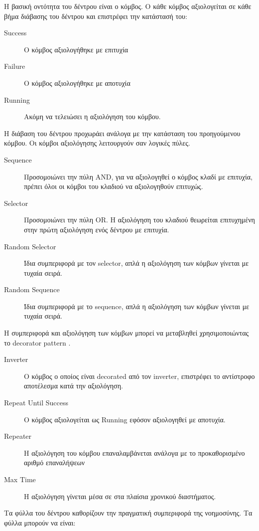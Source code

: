 Η βασική οντότητα του δέντρου είναι ο κόμβος. Ο κάθε κόμβος αξιολογείται σε κάθε βήμα διάβασης του δέντρου και επιστρέφει την κατάστασή του:
\begin{description}
	\item [Success] Ο κόμβος αξιολογήθηκε με επιτυχία
	\item [Failure] Ο κόμβος αξιολογήθηκε με αποτυχία
	\item [Running] Ακόμη να τελειώσει η αξιολόγηση του κόμβου.
\end{description}

Η διάβαση του δέντρου προχωράει ανάλογα με την κατάσταση του προηγούμενου κόμβου. Οι κόμβοι αξιολόγησης λειτουργούν σαν λογικές πύλες.

\begin{description}
	\item [Sequence] Προσομοιώνει την πύλη AND, για να αξιολογηθεί ο κόμβος κλαδί με επιτυχία, πρέπει όλοι οι κόμβοι του κλαδιού να αξιολογηθούν επιτυχώς.
	\item [Selector] Προσομοιώνει την πύλη ΟR. Η αξιολόγηση του κλαδιού θεωρείται επιτυχημένη στην πρώτη αξιολόγηση ενός δέντρου με επιτυχία.
	\item [Random Selector] Ίδια συμπεριφορά με τον selector, απλά η αξιολόγηση των κόμβων γίνεται με τυχαία σειρά.
	\item [Random Sequence] Ίδια συμπεριφορά με το sequence, απλά η αξιολόγηση των κόμβων γίνεται με τυχαία σειρά.
\end{description}
	
H συμπεριφορά και αξιολόγηση των κόμβων μπορεί να μεταβληθεί χρησιμοποιώντας το decorator pattern \cite{Gamma:1995:DPE:186897}.

\begin{description}
	\item [Inverter] Ο κόμβος ο οποίος είναι decorated από τον inverter, επιστρέφει το αντίστροφο αποτέλεσμα κατά την αξιολόγηση.
	\item [Repeat Until Success] O κόμβος αξιολογείται ως Running εφόσον αξιολογηθεί με αποτυχία. 
	\item [Repeater] Η αξιολόγηση του κόμβου επαναλαμβάνεται ανάλογα με το προκαθορισμένο αριθμό επαναλήψεων
	\item [Max Time] Η αξιολόγηση γίνεται μέσα σε στα πλαίσια χρονικού διαστήματος.
\end{description}

Τα φύλλα του δέντρου καθορίζουν την πραγματική συμπεριφορά της νοημοσύνης. Τα φύλλα μπορούν να είναι:

